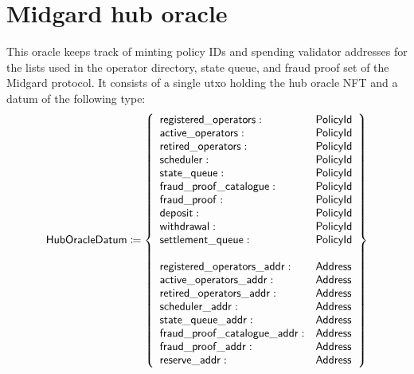 \documentclass[../midgard.tex]{subfiles}
\begin{document}
\section{Midgard hub oracle}
\label{h:midgard-hub-oracle}

This oracle keeps track of minting policy IDs and spending validator addresses for the lists used in the operator directory, state queue, and fraud proof set of the Midgard protocol.
It consists of a single utxo holding the hub oracle NFT and a datum of the following type:
\begin{equation*}
    \mathsf{HubOracleDatum} \coloneq \left\{
    \begin{array}{ll}
        \mathsf{registered\_operators} : & \mathsf{PolicyId} \\
        \mathsf{active\_operators} : & \mathsf{PolicyId} \\
        \mathsf{retired\_operators} : & \mathsf{PolicyId} \\
        \mathsf{scheduler} : & \mathsf{PolicyId} \\
        \mathsf{state\_queue} : & \mathsf{PolicyId} \\
        \mathsf{fraud\_proof\_catalogue} : & \mathsf{PolicyId} \\
        \mathsf{fraud\_proof} : & \mathsf{PolicyId} \\
        \mathsf{deposit} : & \mathsf{PolicyId} \\
        \mathsf{withdrawal} : & \mathsf{PolicyId} \\
        \mathsf{settlement\_queue} : & \mathsf{PolicyId} \\
        \\
        \mathsf{registered\_operators\_addr} : & \mathsf{Address} \\
        \mathsf{active\_operators\_addr} : & \mathsf{Address} \\
        \mathsf{retired\_operators\_addr} : & \mathsf{Address} \\
        \mathsf{scheduler\_addr} : & \mathsf{Address} \\
        \mathsf{state\_queue\_addr} : & \mathsf{Address} \\
        \mathsf{fraud\_proof\_catalogue\_addr} : & \mathsf{Address} \\
        \mathsf{fraud\_proof\_addr} : & \mathsf{Address} \\
        \mathsf{reserve\_addr} : & \mathsf{Address}
    \end{array} \right\}
\end{equation*}

\todo
\end{document}

